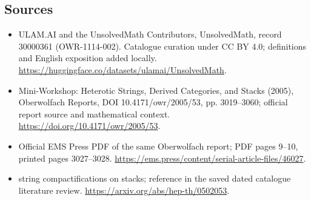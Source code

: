 \documentclass[11pt]{article}
\begin{document}
\subsection{Sources}
\begin{itemize}
\item[\hypertarget{source:30000361:1}{S1}] ULAM.AI and the UnsolvedMath Contributors, UnsolvedMath, record 30000361 (OWR-1114-002). Catalogue curation under CC BY 4.0; definitions and English exposition added locally.
\url{https://huggingface.co/datasets/ulamai/UnsolvedMath}.
\item[\hypertarget{source:30000361:2}{S2}] Mini-Workshop: Heterotic Strings, Derived Categories, and Stacks (2005), Oberwolfach Reports, DOI 10.4171/owr/2005/53, pp. 3019--3060; official report source and mathematical context.
\url{https://doi.org/10.4171/owr/2005/53}.
\item[\hypertarget{source:30000361:3}{S3}] Official EMS Press PDF of the same Oberwolfach report; PDF pages 9--10, printed pages 3027--3028.
\url{https://ems.press/content/serial-article-files/46027}.
\item[\hypertarget{source:30000361:4}{S4}] string compactifications on stacks; reference in the saved dated catalogue literature review.
\url{https://arxiv.org/abs/hep-th/0502053}.
\end{itemize}
\label{end:30000361}
\end{document}

